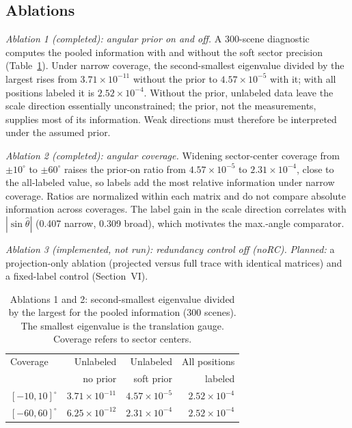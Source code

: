 \documentclass[conference]{IEEEtran}
\begin{document}
\subsection{Ablations}
\emph{Ablation 1 (completed): angular prior on and off.} A 300-scene diagnostic computes the pooled information with and without the soft sector precision (Table~\ref{tab:prior}). Under narrow coverage, the second-smallest eigenvalue divided by the largest rises from $3.71\times10^{-11}$ without the prior to $4.57\times10^{-5}$ with it; with all positions labeled it is $2.52\times10^{-4}$. Without the prior, unlabeled data leave the scale direction essentially unconstrained; the prior, not the measurements, supplies most of its information. Weak directions must therefore be interpreted under the assumed prior.

\emph{Ablation 2 (completed): angular coverage.} Widening sector-center coverage from $\pm10^\circ$ to $\pm60^\circ$ raises the prior-on ratio from $4.57\times10^{-5}$ to $2.31\times10^{-4}$, close to the all-labeled value, so labels add the most relative information under narrow coverage. Ratios are normalized within each matrix and do not compare absolute information across coverages. The label gain in the scale direction correlates with $|\sin\widehat\theta|$ (0.407 narrow, 0.309 broad), which motivates the max.-angle comparator.

\emph{Ablation 3 (implemented, not run): redundancy control off (noRC).} \emph{Planned:} a projection-only ablation (projected versus full trace with identical matrices) and a fixed-label control (Section~VI).

\begin{table}[t]\centering\small
\caption{Ablations 1 and 2: second-smallest eigenvalue divided by the largest for the pooled information (300 scenes). The smallest eigenvalue is the translation gauge. Coverage refers to sector centers.}\label{tab:prior}
\begin{tabular}{lrrr}\toprule
Coverage & Unlabeled & Unlabeled & All positions\\
 & no prior & soft prior & labeled\\\midrule
$[-10,10]^\circ$ & $3.71\times10^{-11}$ & $4.57\times10^{-5}$ & $2.52\times10^{-4}$\\
$[-60,60]^\circ$ & $6.25\times10^{-12}$ & $2.31\times10^{-4}$ & $2.52\times10^{-4}$\\\bottomrule
\end{tabular}
\end{table}
\end{document}
